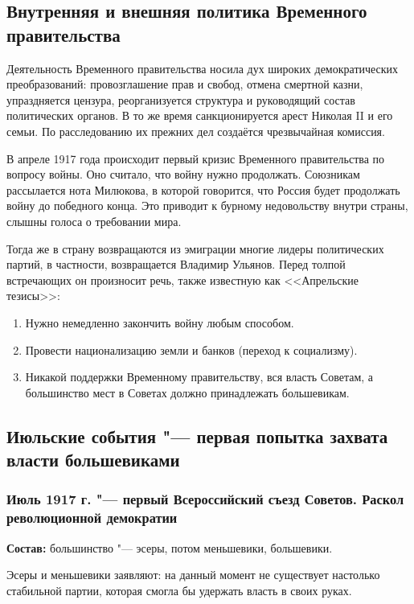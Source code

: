 \subsection{Внутренняя и внешняя политика Временного правительства}

Деятельность Временного правительства носила дух широких демократических преобразований: провозглашение прав и свобод, отмена смертной казни, упраздняется цензура, реорганизуется структура и руководящий состав политических органов. В то же время санкционируется арест Николая II и его семьи. По расследованию их прежних дел создаётся чрезвычайная комиссия.

В апреле 1917 года происходит первый кризис Временного правительства по вопросу войны. Оно считало, что войну нужно продолжать. Союзникам рассылается нота Милюкова, в которой говорится, что Россия будет продолжать войну до победного конца. Это приводит к бурному недовольству внутри страны, слышны голоса о требовании мира.
 
Тогда же в страну возвращаются из эмиграции многие лидеры политических партий, в частности, возвращается Владимир Ульянов. Перед толпой встречающих он произносит речь, также известную как <<Апрельские тезисы>>:

\begin{enumerate}
    \item Нужно немедленно закончить войну любым способом.
    \item Провести национализацию земли и банков (переход к социализму).
    \item Никакой поддержки Временному правительству, вся власть Советам, а большинство мест в Советах должно принадлежать большевикам.
\end{enumerate}

\subsection{Июльские события "--- первая попытка захвата власти большевиками}

\subsubsection{Июль 1917 г. "--- первый Всероссийский съезд Советов. Раскол революционной демократии}

\textbf{Состав:} большинство "--- эсеры, потом меньшевики, большевики.

Эсеры и меньшевики заявляют: на данный момент не существует настолько стабильной партии, которая смогла бы удержать власть в своих руках.

